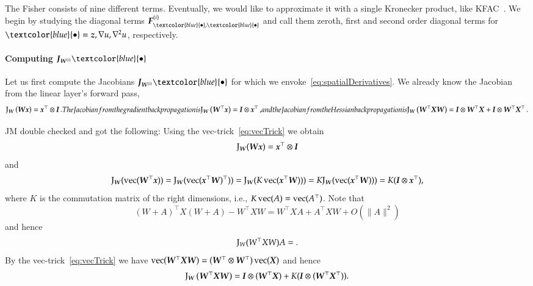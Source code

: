 The Fisher consists of nine different terms.
Eventually, we would like to approximate it with a single Kronecker product, like KFAC~\citep{martens2015optimizing}.
We begin by studying the diagonal terms $\mF_{\textcolor{blue}{\bullet}, \textcolor{blue}{\bullet}}^{(i)}$ and call them zeroth, first and second order diagonal terms for $\textcolor{blue}{\bullet} = \vz, \nabla u, \nabla^2 u$, respectively.

\paragraph{Computing $\mJ_{\mW^{(i)}}\textcolor{blue}{\bullet}$}
Let us first compute the Jacobians $\mJ_{\mW^{(i)}}\textcolor{blue}{\bullet}$ for which we envoke~\eqref{eq:spatialDerivatives}.
We already know the Jacobian from the linear layer's forward pass,
\begin{subequations}\label{eq:fisher-jacobians}
  \begin{align}
    \jac_{\mW}\left( \mW \vx \right) = \vx^{\top} \otimes \mI\,.
  \end{align}
  The Jacobian from the gradient backpropagation is
  \begin{align}
    \jac_{\mW}\left( \mW^{\top} \vx \right) = \mI \otimes \vx^{\top}\,,
  \end{align}
  and the Jacobian from the Hessian backpropagation is
  \begin{align}\label{subeq:fisher-jacobians-hbp}
    \jac_{\mW}\left( \mW^{\top} \mX \mW \right) = \mI \otimes \mW^{\top}\mX + \mI \otimes \mW^{\top}\mX^{\top}\,.
  \end{align}
\end{subequations}

JM double checked and got the following:
Using the vec-trick~\eqref{eq:vecTrick} we obtain
\[  \mathrm{J}_{{\boldsymbol{W}}}({\boldsymbol{W}} {\boldsymbol{x}}) = {\boldsymbol{x}}^\top\otimes {\boldsymbol{I}} \]
and
\[ \mathrm{J}_{\boldsymbol{W}}(\operatorname{vec}({\boldsymbol{W}}^\top {\boldsymbol{x}})) = \mathrm{J}_{\boldsymbol{W}}(\operatorname{vec}({\boldsymbol{x}}^\top{\boldsymbol{W}})^\top)) = \mathrm{J}_{\boldsymbol{W}}(K\operatorname{vec}({\boldsymbol{x}}^\top{\boldsymbol{W}}))) = K\mathrm{J}_{\boldsymbol{W}}(\operatorname{vec}({\boldsymbol{x}}^\top{\boldsymbol{W}}))) = K ({\boldsymbol{I}}\otimes {\boldsymbol{x}}^\top),  \]
where $K$ is the commutation matrix of the right dimensions, i.e., $K\operatorname{vec}(A) = \operatorname{vec}(A^\top)$.
Note that
\[ (W+A)^\top X (W+A) - W^\top X W = W^\top X A + A^\top X W + O(\lVert A \rVert^2) \]
and hence
\[ \mathrm{J}_W(W^\top X W)A = . \]
By the vec-trick~\eqref{eq:vecTrick} we have $\operatorname{vec}({\boldsymbol{W}}^\top{\boldsymbol{X}} {\boldsymbol{W}}) = ({\boldsymbol{W}}^\top\otimes {\boldsymbol{W}}^\top)\operatorname{vec}({\boldsymbol{X}})$ and hence
\[ \mathrm{J}_{{\boldsymbol{W}}}\left( {\boldsymbol{W}}^{\top} {\boldsymbol{X}} {\boldsymbol{W}} \right) = {\boldsymbol{I}} \otimes ({\boldsymbol{W}}^{\top}{\boldsymbol{X}}) + K ({\boldsymbol{I}} \otimes ({\boldsymbol{W}}^{\top}{\boldsymbol{X}}^{\top})). \]

